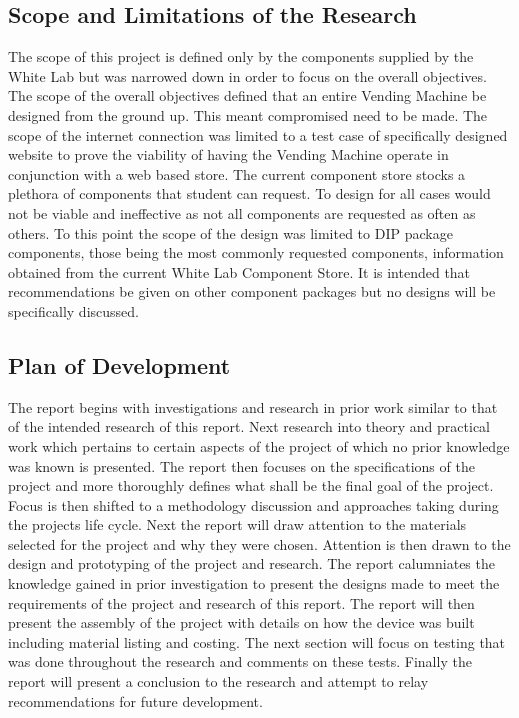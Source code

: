 \documentclass[a4paper,11pt]{article}
\numberwithin{figure}{section}
\numberwithin{table}{section}
\begin{document}
	\subsection{Scope and Limitations of the Research}
The scope of this project is defined only by the components supplied by the White Lab but was narrowed down in order to focus on the overall objectives. The scope of the overall objectives defined that an entire Vending Machine be designed from the ground up. This meant compromised need to be made. The scope of the internet connection was limited to a test case of specifically designed website to prove the viability of having the Vending Machine operate in conjunction with a web based store. The current component store stocks a plethora of components that student can request. To design for all cases would not be viable and ineffective as not all components are requested as often as others. To this point the scope of the design was limited to DIP package components, those being the most commonly requested components, information obtained from the current White Lab Component Store. It is intended that recommendations be given on other component packages but no designs will be specifically discussed. 
	\subsection{Plan of Development}	
The report begins with investigations and research in prior work similar to that of the intended research of this report. Next research into theory and practical work which pertains to certain aspects of the project of which no prior knowledge was known is presented. The report then focuses on the specifications of the project and more thoroughly defines what shall be the final goal of the project. Focus is then shifted to a methodology discussion and approaches taking during the projects life cycle. Next the report will draw attention to the materials selected for the project and why they were chosen. Attention is then drawn to the design and prototyping of the project and research. The report calumniates the knowledge gained in prior investigation to present the designs made to meet the requirements of the project and research of this report. The report will then present the assembly of the project with details on how the device was built including material listing and costing. The next section will focus on testing that was done throughout the research and comments on these tests. Finally the report will present a conclusion to the research and attempt to relay recommendations for future development.
\end{document}
